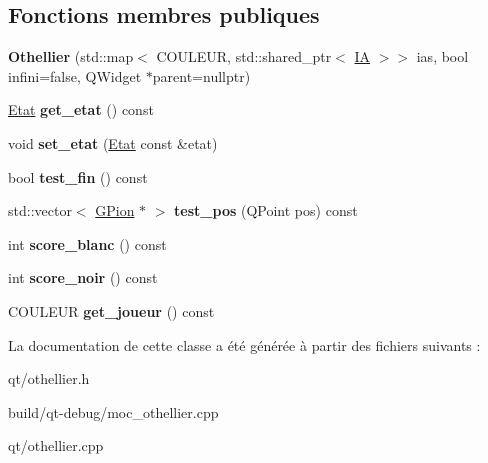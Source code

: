 \subsection*{Fonctions membres publiques}
\begin{DoxyCompactItemize}
\item 
{\bfseries Othellier} (std\+::map$<$ C\+O\+U\+L\+E\+UR, std\+::shared\+\_\+ptr$<$ \hyperlink{classIA}{IA} $>$$>$ ias, bool infini=false, Q\+Widget $\ast$parent=nullptr)\hypertarget{classOthellier_ac316a7b9ce63055bd9ec6478de58b4ca}{}\label{classOthellier_ac316a7b9ce63055bd9ec6478de58b4ca}

\item 
\hyperlink{structEtat}{Etat} {\bfseries get\+\_\+etat} () const \hypertarget{classOthellier_af08e758da67d6ac6b816f8a7fca388a4}{}\label{classOthellier_af08e758da67d6ac6b816f8a7fca388a4}

\item 
void {\bfseries set\+\_\+etat} (\hyperlink{structEtat}{Etat} const \&etat)\hypertarget{classOthellier_a1e734c9ae8c3c48d6d14ab6239539f64}{}\label{classOthellier_a1e734c9ae8c3c48d6d14ab6239539f64}

\item 
bool {\bfseries test\+\_\+fin} () const \hypertarget{classOthellier_a290ceecc7023c9e0922d2fb144cd3d88}{}\label{classOthellier_a290ceecc7023c9e0922d2fb144cd3d88}

\item 
std\+::vector$<$ \hyperlink{classGPion}{G\+Pion} $\ast$ $>$ {\bfseries test\+\_\+pos} (Q\+Point pos) const \hypertarget{classOthellier_ae5529c1d3820960f3959a84f13e5ea5d}{}\label{classOthellier_ae5529c1d3820960f3959a84f13e5ea5d}

\item 
int {\bfseries score\+\_\+blanc} () const \hypertarget{classOthellier_a5506485735f33a832375d216f8112db6}{}\label{classOthellier_a5506485735f33a832375d216f8112db6}

\item 
int {\bfseries score\+\_\+noir} () const \hypertarget{classOthellier_aed3600f23b4a9aae12e1315fa6b856a3}{}\label{classOthellier_aed3600f23b4a9aae12e1315fa6b856a3}

\item 
C\+O\+U\+L\+E\+UR {\bfseries get\+\_\+joueur} () const \hypertarget{classOthellier_a3c11f449ea5e3e4c389599db7a46b8e1}{}\label{classOthellier_a3c11f449ea5e3e4c389599db7a46b8e1}

\end{DoxyCompactItemize}


La documentation de cette classe a été générée à partir des fichiers suivants \+:\begin{DoxyCompactItemize}
\item 
qt/othellier.\+h\item 
build/qt-\/debug/moc\+\_\+othellier.\+cpp\item 
qt/othellier.\+cpp\end{DoxyCompactItemize}
